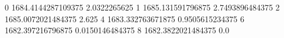 0 1684.4144287109375 2.0322265625
1 1685.131591796875 2.7493896484375
2 1685.0072021484375 2.625
4 1683.332763671875 0.9505615234375
6 1682.397216796875 0.0150146484375
8 1682.3822021484375 0.0
